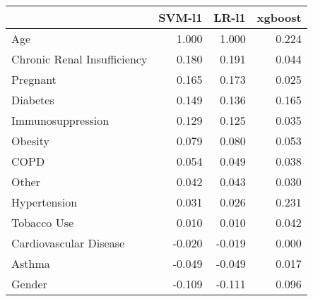 \begin{tabular}{lrrr}
\toprule
{} &  SVM-l1 &  LR-l1 &  xgboost \\
\midrule
Age                         &   1.000 &  1.000 &    0.224 \\
Chronic Renal Insufficiency &   0.180 &  0.191 &    0.044 \\
Pregnant                    &   0.165 &  0.173 &    0.025 \\
Diabetes                    &   0.149 &  0.136 &    0.165 \\
Immunosuppression           &   0.129 &  0.125 &    0.035 \\
Obesity                     &   0.079 &  0.080 &    0.053 \\
COPD                        &   0.054 &  0.049 &    0.038 \\
Other                       &   0.042 &  0.043 &    0.030 \\
Hypertension                &   0.031 &  0.026 &    0.231 \\
Tobacco Use                 &   0.010 &  0.010 &    0.042 \\
Cardiovascular Disease      &  -0.020 & -0.019 &    0.000 \\
Asthma                      &  -0.049 & -0.049 &    0.017 \\
Gender                      &  -0.109 & -0.111 &    0.096 \\
\bottomrule
\end{tabular}
